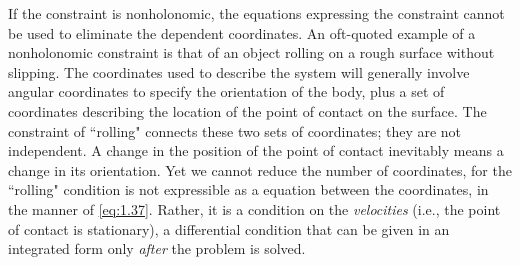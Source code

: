 If the constraint is nonholonomic, the equations expressing the constraint cannot be used to eliminate the dependent coordinates. An oft-quoted example of a nonholonomic constraint is that of an object rolling on a rough surface without slipping. The coordinates used to describe the system will generally involve angular coordinates to specify the orientation of the body, plus a set of coordinates describing the location of the point of contact on the surface. The constraint of ``rolling" connects these two sets of coordinates; they are not independent. A change in the position of the point of contact inevitably means a change in its orientation. Yet we cannot reduce the number of coordinates, for the ``rolling" condition is not expressible as a equation between the coordinates, in the manner of \eqref{eq:1.37}. Rather, it is a condition on the \emph{velocities} (i.e., the point of contact is stationary), a differential condition that can be given in an integrated form only \emph{after} the problem is solved.

